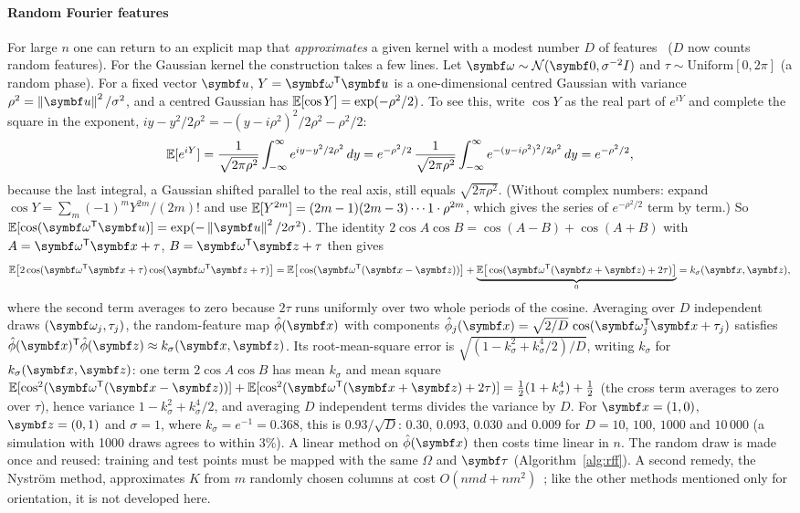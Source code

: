 \documentclass[11pt]{article}
\newcommand{\z}{\vect{z}}
\begin{document}
\paragraph{Random Fourier features} For large $n$ one can return to an explicit map that \emph{approximates} a given
kernel with a modest number $D$ of features~\cite{rahimi2007} ($D$ now counts random features). For the Gaussian kernel
the construction takes a few lines. Let $\vect{\omega} \sim \Normal(\vect{0}, \sigma^{-2}I)$ and $\tau \sim
\mathrm{Uniform}[0, 2\pi]$ (a random phase). For a fixed vector $\vect{u}$, $Y = \vect{\omega}\T\vect{u}$ is a
one-dimensional centred Gaussian with variance $\rho^2 = \norm{\vect{u}}^2/\sigma^2$, and a centred Gaussian has
$\mathbb{E}[\cos Y] = \exp(-\rho^2/2)$. To see this, write $\cos Y$ as the real part of $e^{iY}$ and complete the square in the
exponent, $iy - y^2/2\rho^2 = -(y - i\rho^2)^2/2\rho^2 - \rho^2/2$:
\[
  \mathbb{E}[e^{iY}] = \frac{1}{\sqrt{2\pi\rho^2}}\int_{-\infty}^{\infty} e^{iy - y^2/2\rho^2}\,dy
  = e^{-\rho^2/2}\,\frac{1}{\sqrt{2\pi\rho^2}}\int_{-\infty}^{\infty} e^{-(y - i\rho^2)^2/2\rho^2}\,dy = e^{-\rho^2/2} ,
\]
because the last integral, a Gaussian shifted parallel to the real axis, still equals $\sqrt{2\pi\rho^2}$. (Without complex
numbers: expand $\cos Y = \sum_m (-1)^mY^{2m}/(2m)!$ and use $\mathbb{E}[Y^{2m}] = (2m - 1)(2m - 3)\cdots 1\cdot \rho^{2m}$, which
gives the series of $e^{-\rho^2/2}$ term by term.) So $\E[\cos(\vect{\omega}\T\vect{u})] = \exp(-\norm{\vect{u}}^2/2\sigma^2)$.
The identity $2\cos A\cos B = \cos(A - B) + \cos(A + B)$ with $A = \vect{\omega}\T\x + \tau$, $B = \vect{\omega}\T\z +
\tau$ then gives
\[
  \E\big[2\cos(\vect{\omega}\T\x + \tau)\cos(\vect{\omega}\T\z + \tau)\big]
  = \E\big[\cos(\vect{\omega}\T(\x - \z))\big] + \underbrace{\E\big[\cos(\vect{\omega}\T(\x + \z) + 2\tau)\big]}_{0}
  = k_\sigma(\x, \z) ,
\]
where the second term averages to zero because $2\tau$ runs uniformly over two whole periods of the cosine. Averaging
over $D$ independent draws $(\vect{\omega}_j, \tau_j)$, the random-feature map $\hat\phi(\x)$ with components
$\hat\phi_j(\x) = \sqrt{2/D}\,\cos(\vect{\omega}_j\T\x + \tau_j)$ satisfies $\hat\phi(\x)\T\hat\phi(\z) \approx
k_\sigma(\x, \z)$. Its root-mean-square error is $\sqrt{(1 - k_\sigma^2 + k_\sigma^4/2)/D}$, writing $k_\sigma$ for
$k_\sigma(\x, \z)$: one term $2\cos A\cos B$ has mean $k_\sigma$ and mean square $\E[\cos^2(\vect{\omega}\T(\x - \z))] +
\E[\cos^2(\vect{\omega}\T(\x + \z) + 2\tau)] = \frac12(1 + k_\sigma^4) + \frac12$ (the cross term averages to zero over
$\tau$), hence variance $1 - k_\sigma^2 + k_\sigma^4/2$, and averaging $D$ independent terms divides the variance by $D$.
For $\x = (1, 0)$, $\z = (0, 1)$ and $\sigma = 1$, where $k_\sigma = e^{-1} = 0.368$, this is $0.93/\sqrt D$: $0.30$,
$0.093$, $0.030$ and $0.009$ for $D = 10$, $100$, $1000$ and $10\,000$ (a simulation with 1000 draws agrees to within
3\%). A linear method on $\hat\phi(\x)$ then costs time linear in $n$. The random draw is made once and reused: training
and test points must be mapped with the same $\Omega$ and $\vect{\tau}$ (Algorithm~\ref{alg:rff}). A second remedy, the
Nyström method, approximates $K$ from $m$ randomly chosen columns at cost $O(nmd + nm^2)$~\cite{williams2001}; like
the other methods mentioned only for orientation, it is not developed here.
\end{document}
